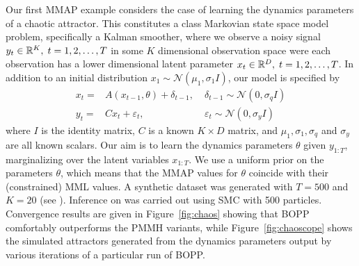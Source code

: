 Our first MMAP example considers the case of learning the dynamics parameters of a chaotic attractor.  
This constitutes a class Markovian state space model problem, specifically a Kalman smoother,
where we observe a noisy signal 
$y_t \in \mathbb{R}^{K}, \; t = 1,2,\dots,T$ in some $K$ dimensional observation space were each 
observation has a lower dimensional latent parameter $x_t \in \mathbb{R}^{D},  \; t = 1,2,\dots,T$.
In addition to an initial distribution $x_1 \sim \mathcal{N} \left(\mu_1, \sigma_1 I\right)$, our model is specified by 
\begin{subequations}
	\label{eq:Kalman}
\begin{align}
x_t = & A \left(x_{t-1}, \theta\right)+\delta_{t-1}, \; & \delta_{t-1} \sim \mathcal{N} \left(0, \sigma_q I\right) \\
y_t = & C x_{t}+\varepsilon_{t}, \; & \varepsilon_{t} \sim \mathcal{N} \left(0, \sigma_y I\right)
\end{align}
\end{subequations}
where $I$ is the identity matrix, $C$ is a known $K \times D$ matrix, and $\mu_1,\sigma_1, \sigma_q$ 
and $\sigma_y$ are all known scalars.  Our aim is to learn the dynamics parameters $\theta$ given
$y_{1:T}$, marginalizing over the latent variables $x_{1:T}$.  We use
a uniform prior on the parameters $\theta$, which means that the MMAP values for $\theta$
coincide with their (constrained) MML values.  A synthetic dataset was generated with $T=500$ and
$K=20$ (see \cite{rainforth2017boppArxiv}).
Inference on \qmarg was carried out using SMC with 500 particles.  
Convergence results are given in Figure~\ref{fig:chaos} showing that BOPP comfortably 
outperforms the PMMH variants, while Figure~\ref{fig:chaoscope} shows the simulated 
attractors generated from the dynamics parameters output by various iterations of a 
particular run of BOPP.
